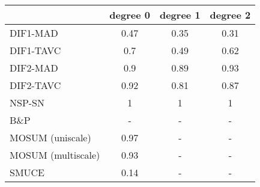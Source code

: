 \begin{tabular}{|l|c|c|c|}
  \hline
 & degree 0 & degree 1 & degree 2 \\ 
  \hline
DIF1-MAD & 0.47 & 0.35 & 0.31 \\ 
  DIF1-TAVC & 0.7 & 0.49 & 0.62 \\ 
  DIF2-MAD & 0.9 & 0.89 & 0.93 \\ 
  DIF2-TAVC & 0.92 & 0.81 & 0.87 \\ 
  NSP-SN & 1 & 1 & 1 \\ 
  B\&P & - & - & - \\ 
  MOSUM (uniscale) & 0.97 & - & - \\ 
  MOSUM (multiscale) & 0.93 & - & - \\ 
  SMUCE & 0.14 & - & - \\ 
   \hline
\end{tabular}
